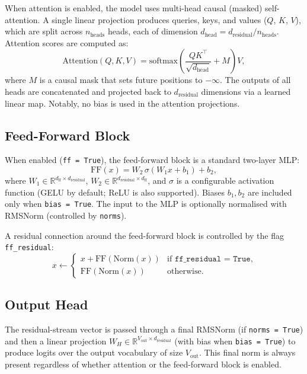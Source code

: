 \documentclass[11pt,a4paper]{article}
\begin{document}
When attention is enabled, the model uses multi-head causal (masked) self-attention. A single linear projection produces queries, keys, and values ($Q$, $K$, $V$), which are split across $n_\text{heads}$ heads, each of dimension $d_\text{head} = d_\text{residual} / n_\text{heads}$. Attention scores are computed as:
\[
    \text{Attention}(Q, K, V) = \text{softmax}\!\left(\frac{QK^\top}{\sqrt{d_\text{head}}} + M\right) V,
\]
where $M$ is a causal mask that sets future positions to $-\infty$. The outputs of all heads are concatenated and projected back to $d_\text{residual}$ dimensions via a learned linear map. Notably, no bias is used in the attention projections.

\subsection{Feed-Forward Block}
\label{sec:ff}

When enabled (\texttt{ff = True}), the feed-forward block is a standard two-layer MLP:
\[
    \text{FF}(x) = W_2\, \sigma\!\left(W_1 x + b_1\right) + b_2,
\]
where $W_1 \in \mathbb{R}^{d_\text{ff} \times d_\text{residual}}$, $W_2 \in \mathbb{R}^{d_\text{residual} \times d_\text{ff}}$, and $\sigma$ is a configurable activation function (GELU by default; ReLU is also supported). Biases $b_1, b_2$ are included only when \texttt{bias = True}. The input to the MLP is optionally normalised with RMSNorm (controlled by \texttt{norms}).

A residual connection around the feed-forward block is controlled by the flag \texttt{ff\_residual}:
\[
    x \leftarrow
    \begin{cases}
        x + \text{FF}(\text{Norm}(x)) & \text{if } \texttt{ff\_residual = True},\\
        \text{FF}(\text{Norm}(x)) & \text{otherwise}.
    \end{cases}
\]

\subsection{Output Head}

The residual-stream vector is passed through a final RMSNorm (if \texttt{norms = True}) and then a linear projection $W_H \in \mathbb{R}^{V_\text{out} \times d_\text{residual}}$ (with bias when \texttt{bias = True}) to produce logits over the output vocabulary of size $V_\text{out}$. This final norm is always present regardless of whether attention or the feed-forward block is enabled.
\end{document}
